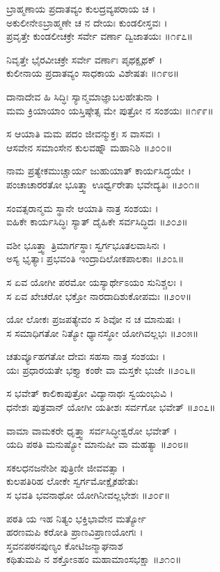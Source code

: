 ಬ್ರಾಹ್ಮಣಾಯ ಪ್ರದಾತವ್ಯಂ ಕುಲದ್ರವ್ಯಪರಾಯ ಚ ।\\
ಅಕುಲೀನೇಽಬ್ರಾಹ್ಮಣೇ ಚ ನ ದೇಯಃ ಕುಂಡಲೀಸ್ತವಃ ।\\
ಪ್ರವೃತ್ತೇ ಕುಂಡಲೀಚಕ್ರೇ ಸರ್ವೇ ವರ್ಣಾ ದ್ವಿಜಾತಯಃ ॥೧೯೭॥

ನಿವೃತ್ತೇ ಭೈರವೀಚಕ್ರೇ ಸರ್ವೇ ವರ್ಣಾಃ ಪೃಥಕ್ಪೃಥಕ್ ।\\
ಕುಲೀನಾಯ ಪ್ರದಾತವ್ಯಂ ಸಾಧಕಾಯ ವಿಶೇಷತಃ ॥೧೯೮॥

ದಾನಾದೇವ ಹಿ ಸಿದ್ಧಿಃ ಸ್ಯಾನ್ಮಮಾಜ್ಞಾಬಲಹೇತುನಾ ।\\
ಮಮ ಕ್ರಿಯಾಯಾಂ ಯಸ್ತಿಷ್ಠೇತ್ಸ ಮೇ ಪುತ್ರೋ ನ ಸಂಶಯಃ ॥೧೯೯॥

ಸ ಆಯಾತಿ ಮಮ ಪದಂ ಜೀವನ್ಮುಕ್ತಃ ಸ ವಾಸವಃ ।\\
ಆಸವೇನ ಸಮಾಂಸೇನ ಕುಲವಹ್ನೌ ಮಹಾನಿಶಿ ॥೨೦೦॥

ನಾಮ ಪ್ರತ್ಯೇಕಮುಚ್ಚಾರ್ಯ ಜುಹುಯಾತ್ ಕಾರ್ಯಸಿದ್ಧಯೇ ।\\
ಪಂಚಾಚಾರರತೋ ಭೂತ್ತ್ವಾ ಊರ್ಧ್ವರೇತಾ ಭವೇದ್ಯತಿಃ ॥೨೦೧॥

ಸಂವತ್ಸರಾನ್ಮಮ ಸ್ಥಾನೇ ಆಯಾತಿ ನಾತ್ರ ಸಂಶಯಃ ।\\
ಐಹಿಕೇ ಕಾರ್ಯಸಿದ್ಧಿಃ ಸ್ಯಾತ್ ದೈಹಿಕೇ ಸರ್ವಸಿದ್ಧಿದಃ ॥೨೦೨॥

ವಶೀ ಭೂತ್ತ್ವಾ ತ್ರಿಮಾರ್ಗಸ್ಥಾಃ ಸ್ವರ್ಗಭೂತಲವಾಸಿನಃ ।\\
ಅಸ್ಯ ಭೃತ್ಯಾಃ ಪ್ರಭವಂತಿ ಇಂದ್ರಾದಿಲೋಕಪಾಲಕಾಃ ॥೨೦೩॥

ಸ ಏವ ಯೋಗೀ ಪರಮೋ ಯಸ್ಯಾರ್ಥೇಽಯಂ ಸುನಿಶ್ಚಲಃ ।\\
ಸ ಏವ ಖೇಚರೋ ಭಕ್ತೋ ನಾರದಾದಿಶುಕೋಪಮಃ ॥೨೦೪॥

ಯೋ ಲೋಕಃ ಪ್ರಜಪತ್ಯೇವಂ ಸ ಶಿವೋ ನ ಚ ಮಾನುಷಃ ।\\
ಸ ಸಮಾಧಿಗತೋ ನಿತ್ಯೋ ಧ್ಯಾನಸ್ಥೋ ಯೋಗಿವಲ್ಲಭಃ ॥೨೦೫॥

ಚತುರ್ವ್ಯೂಹಗತೋ ದೇವಃ ಸಹಸಾ ನಾತ್ರ ಸಂಶಯಃ ।\\
ಯಃ ಪ್ರಧಾರಯತೇ ಭಕ್ತ್ಯಾ ಕಂಠೇ ವಾ ಮಸ್ತಕೇ ಭುಜೇ ॥೨೦೬॥

ಸ ಭವೇತ್ ಕಾಲಿಕಾಪುತ್ರೋ ವಿದ್ಯಾನಾಥಃ ಸ್ವಯಂಭುವಿ ।\\
ಧನೇಶಃ ಪುತ್ರವಾನ್ ಯೋಗೀ ಯತೀಶಃ ಸರ್ವಗೋ ಭವೇತ್ ॥೨೦೭॥

ವಾಮಾ ವಾಮಕರೇ ಧೃತ್ತ್ವಾ ಸರ್ವಸಿದ್ಧೀಶ್ವರೋ ಭವೇತ್ ।\\
ಯದಿ ಪಠತಿ ಮನುಷ್ಯೋ ಮಾನುಷೀ ವಾ ಮಹತ್ಯಾ ॥೨೦೮॥

ಸಕಲಧನಜನೇಶೀ ಪುತ್ರಿಣೀ ಜೀವವತ್ಸಾ ।\\
ಕುಲಪತಿರಿಹ ಲೋಕೇ ಸ್ವರ್ಗಮೋಕ್ಷೈಕಹೇತುಃ\\
ಸ ಭವತಿ ಭವನಾಥೋ ಯೋಗಿನೀವಲ್ಲಭೇಶಃ ॥೨೦೯॥

ಪಠತಿ ಯ ಇಹ ನಿತ್ಯಂ ಭಕ್ತಿಭಾವೇನ ಮರ್ತ್ಯೋ\\
ಹರಣಮಪಿ ಕರೋತಿ ಪ್ರಾಣವಿಪ್ರಾಣಯೋಗಃ ।\\
ಸ್ತವನಪಠನಪುಣ್ಯಂ ಕೋಟಿಜನ್ಮಾಘನಾಶ\\
ಕಥಿತುಮಪಿ ನ ಶಕ್ತೋಽಹಂ ಮಹಾಮಾಂಸಭಕ್ಷಾ ॥೨೧೦॥

